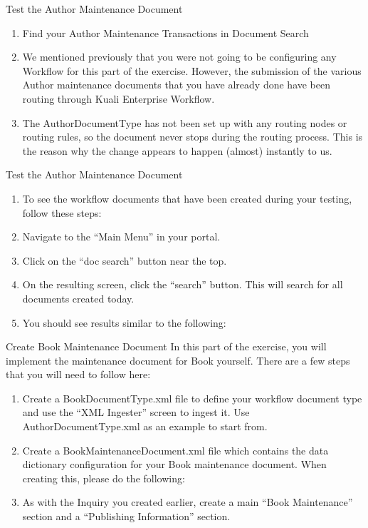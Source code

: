 \documentclass[xcolor=dvipsnames,14pt,professionalfonts]{beamer}
\begin{document}
\begin{frame}{Test the Author Maintenance Document}
  \begin{enumerate}
  \item Find your Author Maintenance Transactions in Document Search
  \item We mentioned previously that you were not going to be configuring any Workflow for this part of the exercise.  However, the submission of the various Author maintenance documents that you have already done have been routing through Kuali Enterprise Workflow.
    \item The AuthorDocumentType has not been set up with any routing nodes or routing rules, so the document never stops during the routing process.  This is the reason why the change appears to happen (almost) instantly to us.
  \end{enumerate}
\end{frame}

\begin{frame}{Test the Author Maintenance Document}
  \begin{enumerate}
  \item To see the workflow documents that have been created during your testing, follow these steps:
  \item Navigate to the “Main Menu” in your portal.
  \item Click on the “doc search” button near the top.
  \item On the resulting screen, click the “search” button.  This will search for all documents created today.
  \item You should see results similar to the following:
  \end{enumerate}
\end{frame}

 \begin{frame}{Create Book Maintenance Document}
In this part of the exercise, you will implement the maintenance document for Book yourself.
There are a few steps that you will need to follow here: 
 \begin{enumerate}
 \item Create a BookDocumentType.xml file to define your workflow document type and use the “XML Ingester” screen to ingest it.  Use AuthorDocumentType.xml as an example to start from.
 \item Create a BookMaintenanceDocument.xml file which contains the data dictionary configuration for your Book maintenance document.  When creating this, please do the following:
   \item As with the Inquiry you created earlier, create a main “Book Maintenance” section and a “Publishing Information” section.
  \end{enumerate}
\end{frame}
 
\end{document}
